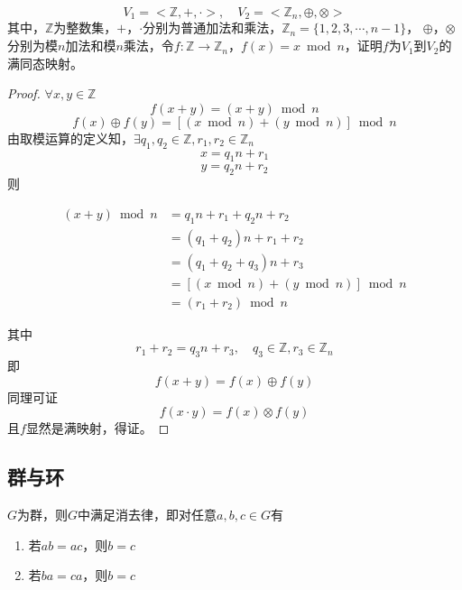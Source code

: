 \begin{proposition}

    $$V_1 = <\mathbb{Z}, +, \cdot>, \quad V_2 = <\mathbb{Z}_n, \oplus, \otimes>$$
    其中，$\mathbb{Z}$为整数集，$+$，$\cdot$分别为普通加法和乘法，$\mathbb{Z}_n = \{1, 2, 3, \cdots, n - 1\}$，
    $\oplus$，$\otimes$分别为模$n$加法和模$n$乘法，令$f: \mathbb{Z} \to \mathbb{Z}_n$，$f(x) = x \bmod{n}$，证明$f$为$V_1$到$V_2$的满同态映射。

\end{proposition}

\begin{proof}

    $\forall x, y \in \mathbb{Z}$
    $$f(x + y) = (x + y) \bmod{n}$$
    $$f(x) \oplus f(y) = [(x \bmod{n}) + (y \bmod{n})] \bmod{n}$$
    由取模运算的定义知，$\exists q_1, q_2 \in \mathbb{Z}, r_1, r_2 \in \mathbb{Z}_n$
    $$x = q_1 n + r_1$$
    $$y = q_2 n + r_2$$
    则
    
    \begin{align*}
        (x + y) \bmod{n} & =  q_1 n + r_1 + q_2 n + r_2 \\
        & = (q_1 + q_2)n + r_1 + r_2 \\
        & = (q_1 + q_2 + q_3)n + r_3 \\
        & = [(x \bmod{n}) + (y \bmod{n})] \bmod{n} \\
        & = (r_1 + r_2) \bmod{n}
    \end{align*}

    其中
    $$r_1 + r_2 = q_3 n + r_3,\quad q_3 \in \mathbb{Z}, r_3 \in \mathbb{Z}_n$$
    即
    $$f(x + y) = f(x) \oplus f(y)$$
    同理可证
    $$f(x \cdot y) = f(x) \otimes f(y)$$
    且$f$显然是满映射，得证。

\end{proof}

\subsection{群与环}

\begin{theorem}

    $G$为群，则$G$中满足消去律，即对任意$a,b,c \in G$有
    \begin{enumerate}

        \item 若$ab = ac$，则$b = c$
        
        \item 若$ba = ca$，则$b = c$
        
    \end{enumerate}

\end{theorem}

